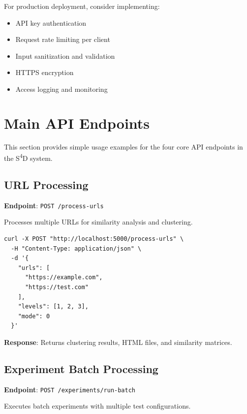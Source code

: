 For production deployment, consider implementing:

\begin{itemize}
    \item API key authentication
    \item Request rate limiting per client
    \item Input sanitization and validation
    \item HTTPS encryption
    \item Access logging and monitoring
\end{itemize}

\section{Main API Endpoints}
\label{sec:main-api-endpoints}

This section provides simple usage examples for the four core API endpoints in the S\textsuperscript{4}D system.

\subsection{URL Processing}
\label{subsec:url-processing-api}

\textbf{Endpoint}: \texttt{POST /process-urls}

Processes multiple URLs for similarity analysis and clustering.

\begin{tcolorbox}[
    colback=gray!5!white,
    colframe=gray!60!black,
    title=\textbf{cURL Example},
    enhanced
]
\begin{verbatim}
curl -X POST "http://localhost:5000/process-urls" \
  -H "Content-Type: application/json" \
  -d '{
    "urls": [
      "https://example.com", 
      "https://test.com"
    ],
    "levels": [1, 2, 3],
    "mode": 0
  }'
\end{verbatim}
\end{tcolorbox}

\textbf{Response}: Returns clustering results, HTML files, and similarity matrices.

\subsection{Experiment Batch Processing}
\label{subsec:experiment-batch}

\textbf{Endpoint}: \texttt{POST /experiments/run-batch}

Executes batch experiments with multiple test configurations.

